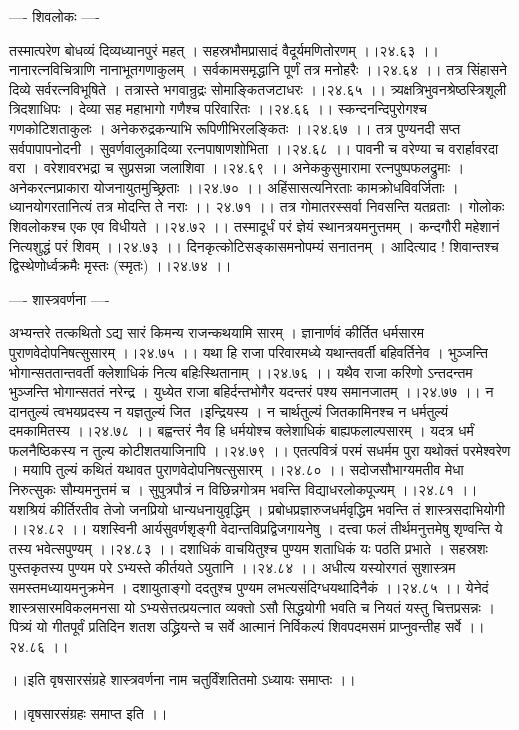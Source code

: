 \documentclass[11pt]{book}
\begin{document}
\begin{landscape}
---- शिवलोकः ----

तस्मात्परेण बोधव्यं दिव्यध्यानपुरं महत् ।
सहस्रभौमप्रासादं वैदूर्यमणितोरणम् ।।२४.६३ ।।
नानारत्नविचित्राणि नानाभूतगणाकुलम् ।
सर्वकामसमृद्धानि पूर्णं तत्र मनोहरैः ।।२४.६४ ।।
तत्र सिंहासने दिव्ये सर्वरत्नविभूषिते ।
तत्रास्ते भगवान्रुद्रः सोमाङ्कितजटाधरः ।।२४.६५ ।।
त्र्यक्षत्रिभुवनश्रेष्ठस्त्रिशूली त्रिदशाधिपः ।
देव्या सह महाभागो गणैश्च परिवारितः ।।२४.६६ ।।
स्कन्दनन्दिपुरोगश्च गणकोटिशताकुलः ।
अनेकरुद्रकन्याभि रूपिणीभिरलङ्कितः ।।२४.६७ ।।
तत्र पुण्यनदी सप्त सर्वपापापनोदनी ।
सुवर्णवालुकादिव्या रत्नपाषाणशोभिता ।।२४.६८ ।।
पावनी च वरेण्या च वरार्हावरदा वरा ।
वरेशावरभद्रा च सुप्रसन्ना जलाशिवा ।।२४.६९ ।।
अनेककुसुमारामा रत्नपुष्पफलद्रुमाः ।
अनेकरत्नप्राकारा योजनायुतमुच्छ्रिताः ।।२४.७० ।।
अहिंसासत्यनिरताः कामक्रोधविवर्जिताः ।
ध्यानयोगरतानित्यं तत्र मोदन्ति ते नराः ।। २४.७१ ।।
तत्र गोमातरस्सर्वा निवसन्ति यतव्रताः ।
गोलोकः शिवलोकश्च एक एव विधीयते ।।२४.७२ ।।
तस्मादूर्धं परं ज्ञेयं स्थानत्रयमनुत्तमम् ।
कन्दगौरी महेशानं नित्यशुद्धं परं शिवम् ।।२४.७३ ।।
दिनकृत्कोटिसङ्कासमनोपम्यं सनातनम् ।
आदित्याद ! शिवान्तश्च द्विस्थेणोर्ध्वक्रमैः मृस्तः (स्मृतः) ।।२४.७४ ।।

---- शास्त्रवर्णना ----

अभ्यन्तरे तत्कथितो ऽद्य सारं
किमन्य राजन्कथयामि सारम् ।
ज्ञानार्णवं कीर्तित धर्मसारम
पुराणवेदोपनिषत्सुसारम् ।।२४.७५ ।।
यथा हि राजा परिवारमध्ये
यथान्तवर्ती बहिवर्तिनेव ।
भुञ्जन्ति भोगान्सततान्तवर्ती
क्लेशाधिकं नित्य बहिःस्थितानाम् ।।२४.७६ ।।
यथैव राजा करिणो ऽन्तदन्तम
भुञ्जन्ति भोगान्सततं नरेन्द्र ।
युध्येत राजा बहिर्दन्तभोगैर
यदन्तरं पश्य समानजातम् ।।२४.७७ ।।
न दानतुल्यं त्वभयप्रदस्य
न यज्ञतुल्यं जित ।इन्द्रियस्य ।
न चार्थतुल्यं जितकामिनश्च
न धर्मतुल्यं दमकामितस्य ।।२४.७८ ।।
बह्वन्तरं नैव हि धर्मयोश्च
क्लेशाधिकं बाह्यफलाल्पसारम् ।
यदत्र धर्मं फलनैष्ठिकस्य
न तुल्य कोटीशतयाजिनापि ।।२४.७९ ।।
एतत्पवित्रं परमं सधर्मम
पुरा यथोक्तं परमेश्वरेण ।
मयापि तुल्यं कथितं यथावत
पुराणवेदोपनिषत्सुसारम् ।।२४.८० ।।
सदोजसौभाग्यमतीव मेधा
निरुत्सुकः सौम्यमनुत्तमं च ।
सुपुत्रपौत्रं न विछिन्नगोत्रम
भवन्ति विद्याधरलोकपूज्यम् ।।२४.८१ ।।
यशश्रियं कीर्तिरतीव तेजो
जनप्रियो धान्यधनायुवृद्धिम् ।
प्रबोधप्रज्ञारुजधर्मवृद्धिम
भवन्ति तं शास्त्रसदाभियोगी ।।२४.८२ ।।
यशस्विनी आर्यसुवर्णशृङ्गी
वेदान्तविप्रद्विजगायनेषु ।
दत्त्वा फलं तीर्थमनुत्तमेषु
शृण्वन्ति ये तस्य भवेत्सपुण्यम् ।।२४.८३ ।।
दशाधिकं वाचयितुश्च पुण्यम
शताधिकं यः पठति प्रभाते ।
सहस्रशः पुस्तकृतस्य पुण्यम
परे ऽभ्यस्ते कीर्तयते ऽयुतानि ।।२४.८४ ।।
अधीत्य यस्योरगतं सुशास्त्रम
समस्तमध्यायमनुक्रमेन ।
दशायुताङ्गो ददतुश्च पुण्यम
लभत्यसंदिग्धयथादिनैकं ।।२४.८५ ।।
येनेदं शास्त्रसारमविकलमनसा यो ऽभ्यसेत्तत्प्रयत्नात
व्यक्तो ऽसौ सिद्धयोगी भवति च नियतं यस्तु चित्तप्रसन्नः ।
पित्र्यं यो गीतपूर्वं प्रतिदिन शतश उद्ध्रियन्ते च सर्वे
आत्मानं निर्विकल्पं शिवपदमसमं प्राप्नुवन्तीह सर्वे ।।२४.८६ ।।

 ।।इति वृषसारसंग्रहे शास्त्रवर्णना नाम चतुर्विंशतितमो ऽध्यायः समाप्तः ।।

 ।।वृषसारसंग्रहः समाप्त इति ।।
 
 
\end{landscape}
\end{document}
